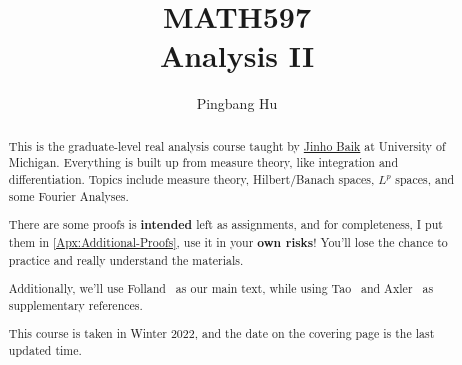 \documentclass[a4paper]{report}
\author{Pingbang Hu}
\title{MATH597\\Analysis II}
\begin{document}
\maketitle

\begin{abstract}
	This is the graduate-level real analysis course taught by \href{http://www.math.lsa.umich.edu/~baik/Welcome.html}{Jinho Baik} at University of Michigan. Everything is built up from measure theory, like integration and differentiation. Topics include measure theory, Hilbert/Banach spaces, \(L^p\) spaces, and some Fourier Analyses.

	There are some proofs is \textbf{intended} left as assignments, and for completeness, I put them in \autoref{Apx:Additional-Proofs}, use it in your \textbf{own risks}! You'll lose the chance to practice and really understand the materials.

	Additionally, we'll use Folland~\cite{folland1999real} as our main text, while using Tao~\cite{tao2013introduction} and Axler~\cite{axler2019measure} as supplementary references.

	\vfill
	This course is taken in Winter 2022, and the date on the covering page is the last updated time.
\end{abstract}

\tableofcontents


\newpage
\appendix
\appendixpage



\newpage
\printbibliography
\end{document}

